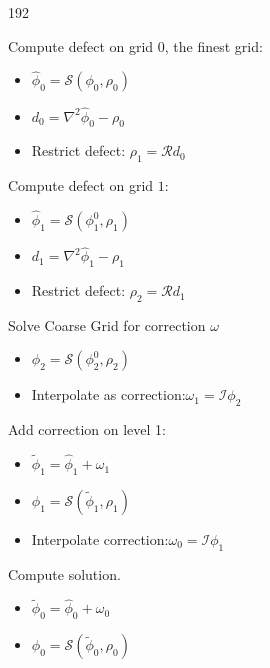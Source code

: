 \begin{dingautolist}{192}
			\item Compute defect on grid \(0\), the finest grid:
		\begin{itemize}
			\item	\( \widehat{\phi}_0 = \mathcal{S}(\phi_0, \rho_0)\)
			\item 	\(d_0 = \nabla^2\widehat{\phi}_0 - \rho_0\)
			\item Restrict defect: \(\rho_1 = \mathcal{R}d_0 \) \nonumber
		\end{itemize}
	\item Compute defect on grid \(1\):
		\begin{itemize}
			\item \(\widehat{\phi}_1 = \mathcal{S}(\phi_1^0, \rho_1)\)
			\item \(d_1 = \nabla^2\widehat{\phi}_1 - \rho_1 \)
			\item Restrict defect: \(\rho_2 = \mathcal{R}d_1 \)
		\end{itemize}
	\item Solve Coarse Grid for correction \(\omega\)
		\begin{itemize}
			\item \( \phi_2 = \mathcal{S}(\phi_2^0, \rho_2)\)
			\item Interpolate as correction:\(\omega_1 = \mathcal{I}\phi_2\)
		\end{itemize}
	\item Add correction on level 1:
		\begin{itemize}
			\item \(\widetilde{\phi}_1 = \widehat{\phi}_1 + \omega_1\)
			\item \( \phi_1 = \mathcal{S}(\widetilde{\phi}_1, \rho_1)  \)
			\item Interpolate correction:\( \omega_0 = \mathcal{I} \phi_1\)
		\end{itemize}
	\item Compute solution.
		\begin{itemize}
			\item \(\widetilde{\phi}_0 = \widehat{\phi}_0 + \omega_0\)
			\item \( \phi_0 = \mathcal{S}(\widetilde{\phi}_0, \rho_0)  \)
		\end{itemize}
\end{dingautolist}
